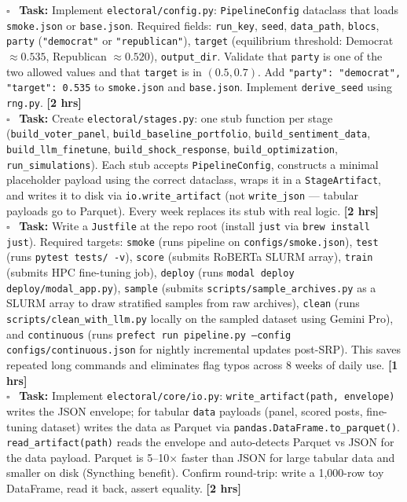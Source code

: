 \documentclass[11pt]{article}
\newcommand{\hrs}[1]{\textbf{[#1 hrs]}}
\newcommand{\task}[2]{%
  \noindent\textbf{Task:} #1 \hfill \hrs{#2}\\}
\newcommand{\done}{\textcolor{sectionblue}{$\square$}\ }
\begin{document}
\begin{taskbox}
\done \task{Implement \texttt{electoral/config.py}: \texttt{PipelineConfig}
  dataclass that loads \texttt{smoke.json} or \texttt{base.json}. Required
  fields: \texttt{run\_key}, \texttt{seed}, \texttt{data\_path}, \texttt{blocs},
  \texttt{party} (\texttt{"democrat"} or \texttt{"republican"}),
  \texttt{target} (equilibrium threshold: Democrat $\approx 0.535$, Republican
  $\approx 0.520$), \texttt{output\_dir}. Validate that \texttt{party} is one
  of the two allowed values and that \texttt{target} is in $(0.5, 0.7)$.
  Add \texttt{"party": "democrat", "target": 0.535} to \texttt{smoke.json}
  and \texttt{base.json}. Implement \texttt{derive\_seed} using \texttt{rng.py}.}{2}

\done \task{Create \texttt{electoral/stages.py}: one stub function per stage
  (\texttt{build\_voter\_panel}, \texttt{build\_baseline\_portfolio},
  \texttt{build\_sentiment\_data}, \texttt{build\_llm\_finetune},
  \texttt{build\_shock\_response}, \texttt{build\_optimization},
  \texttt{run\_simulations}). Each stub accepts \texttt{PipelineConfig},
  constructs a minimal placeholder payload using the correct dataclass,
  wraps it in a \texttt{StageArtifact}, and writes it to disk via
  \texttt{io.write\_artifact} (not \texttt{write\_json} --- tabular payloads
  go to Parquet). Every week replaces its stub with real logic.}{2}

\done \task{Write a \texttt{Justfile} at the repo root (install \texttt{just}
  via \texttt{brew install just}). Required targets: \texttt{smoke} (runs
  pipeline on \texttt{configs/smoke.json}), \texttt{test} (runs
  \texttt{pytest tests/ -v}), \texttt{score} (submits RoBERTa SLURM array),
  \texttt{train} (submits HPC fine-tuning job), \texttt{deploy} (runs
  \texttt{modal deploy deploy/modal\_app.py}),
  \texttt{sample} (submits \texttt{scripts/sample\_archives.py} as a
  SLURM array to draw stratified samples from raw archives),
  \texttt{clean} (runs \texttt{scripts/clean\_with\_llm.py} locally on
  the sampled dataset using Gemini Pro),
  and \texttt{continuous} (runs \texttt{prefect run pipeline.py --config
  configs/continuous.json} for nightly incremental updates post-SRP).
  This saves repeated long commands and eliminates flag typos
  across 8 weeks of daily use.}{1}

\done \task{Implement \texttt{electoral/core/io.py}: \texttt{write\_artifact(path,
  envelope)} writes the JSON envelope; for tabular \texttt{data} payloads
  (panel, scored posts, fine-tuning dataset) writes the data as Parquet via
  \texttt{pandas.DataFrame.to\_parquet()}. \texttt{read\_artifact(path)} reads
  the envelope and auto-detects Parquet vs JSON for the data payload.
  Parquet is 5--10$\times$ faster than JSON for large tabular data and
  smaller on disk (Syncthing benefit). Confirm round-trip: write a 1,000-row
  toy DataFrame, read it back, assert equality.}{2}


\end{taskbox}
\end{document}
